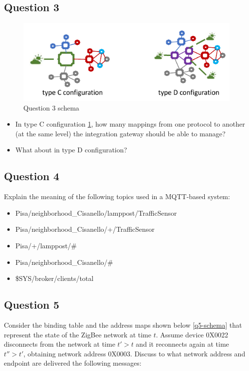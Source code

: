 \subsection{Question 3}

\begin{figure}[h]
	\centering\includegraphics[scale=0.50]{images/Pasted image 20230601094121.png}
	\caption{Question 3 schema}
	\label{q3-schema}
\end{figure}

\begin{itemize}
	\item In type C configuration \ref{q3-schema}, how many mappings from one
	protocol to another (at the same level) the integration
	gateway should be able to manage?
	\item What about in type D configuration?
\end{itemize}


\subsection{Question 4}
Explain the meaning of the following topics used in a MQTT-based
system:
\begin{itemize}
	\item Pisa/neighborhood\_Cisanello/lamppost/TrafficSensor
	\item Pisa/neighborhood\_Cisanello/+/TrafficSensor
	\item Pisa/+/lamppost/\#
	\item Pisa/neighborhood\_Cisanello/\#
	\item \$SYS/broker/clients/total
\end{itemize}


\subsection{Question 5}
Consider the binding table and the address maps shown below \ref{q5-schema} that represent the state of the ZigBee network at time $t$. Assume device 0X0022 disconnects from the network at time $t'>t$ and it reconnects again at time $t''>t'$, obtaining network address 0X0003. Discuss to what network address and endpoint are delivered the following messages:

